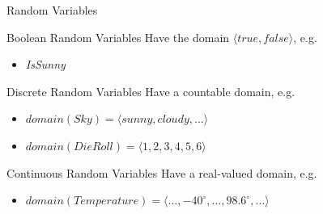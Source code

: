 \documentclass[14pt]{beamer}
\begin{document}
\begin{frame}{Random Variables}
	\begin{block}{Boolean Random Variables}
		Have the domain $\langle \textit{true}, \textit{false} \rangle$, e.g.
		\begin{itemize}
			\item \textit{IsSunny}
		\end{itemize}
	\end{block}
	\pause
	\begin{block}{Discrete Random Variables}
		Have a countable domain, e.g.
		\begin{itemize}
			\item $\textit{domain}(\textit{Sky}) =
			       \langle \textit{sunny}, \textit{cloudy}, \ldots \rangle$
			\item $\textit{domain}(\textit{DieRoll}) =
			       \langle 1, 2, 3, 4, 5, 6 \rangle$
		\end{itemize}
	\end{block}
	\pause
	\begin{block}{Continuous Random Variables}
		Have a real-valued domain, e.g.
		\begin{itemize}
			\item $\textit{domain}(\textit{Temperature}) =
			       \langle \ldots, -40^{\circ}, \ldots, 98.6^{\circ}, \ldots \rangle$
		\end{itemize}
	\end{block}
\end{frame}
\end{document}
